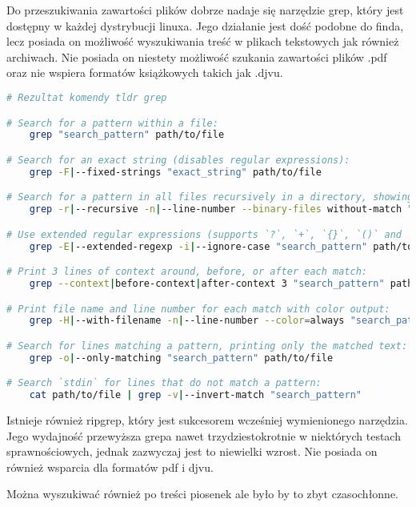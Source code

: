 Do przeszukiwania zawartości plików dobrze nadaje się narzędzie grep, który jest
dostępny w każdej dystrybucji linuxa. Jego działanie jest dość podobne do finda,
lecz posiada on możliwość wyszukiwania treść w plikach tekstowych jak również
archiwach. Nie posiada on niestety możliwość szukania zawartości plików .pdf oraz
nie wspiera formatów książkowych takich jak .djvu.
\begin{lstlisting}[language=bash]
# Rezultat komendy tldr grep 

# Search for a pattern within a file:
    grep "search_pattern" path/to/file

# Search for an exact string (disables regular expressions):
    grep -F|--fixed-strings "exact_string" path/to/file

# Search for a pattern in all files recursively in a directory, showing line numbers of matches, ignoring binary files:
    grep -r|--recursive -n|--line-number --binary-files without-match "search_pattern" path/to/directory

# Use extended regular expressions (supports `?`, `+`, `{}`, `()` and `|`), in case-insensitive mode:
    grep -E|--extended-regexp -i|--ignore-case "search_pattern" path/to/file

# Print 3 lines of context around, before, or after each match:
    grep --context|before-context|after-context 3 "search_pattern" path/to/file

# Print file name and line number for each match with color output:
    grep -H|--with-filename -n|--line-number --color=always "search_pattern" path/to/file

# Search for lines matching a pattern, printing only the matched text:
    grep -o|--only-matching "search_pattern" path/to/file

# Search `stdin` for lines that do not match a pattern:
    cat path/to/file | grep -v|--invert-match "search_pattern"
\end{lstlisting}
Istnieje również ripgrep, który jest sukcesorem wcześniej wymienionego
narzędzia. Jego wydajność przewyższa grepa nawet trzydziestokrotnie w niektórych testach sprawnościowych,
jednak zazwyczaj jest to niewielki wzrost. Nie posiada on również wsparcia dla formatów pdf i djvu.

Można wyszukiwać również po treści piosenek ale było by to zbyt czasochłonne.
